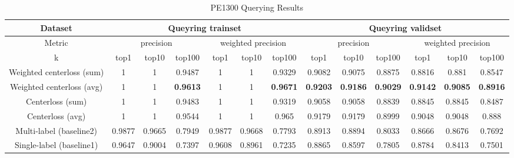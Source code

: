 \begin{table*}[!htb]%
\caption{PE1300 Querying Results}
\label{tab:pe_result}
\begin{minipage}{\textwidth}
\begin{center}
\begin{tabular}{|c|c|c|c|c|c|c|c|c|c|c|c|c|}
\hline
Dataset             & \multicolumn{6}{c|}{Queyring trainset}                      & \multicolumn{6}{c|}{Queyring validset}                      \\ \hline
Metric              & \multicolumn{3}{c|}{precision}  & \multicolumn{3}{c|}{weighted precision} & \multicolumn{3}{c|}{precision}  & \multicolumn{3}{c|}{weighted precision} \\ \hline
k              & top1   & top10  & top100 & top1      & top10     & top100   & top1   & top10  & top100 & top1      & top10     & top100   \\ \hline
Weighted centerloss (sum)  & 1      & 1      & 0.9487 & 1         & 1         & 0.9329   & 0.9082 & 0.9075 & 0.8875 & 0.8816    & 0.881     & 0.8547   \\ \hline
Weighted centerloss (avg) & 1      & 1      & \textbf{0.9613} & 1         & 1         & \textbf{0.9671}   & \textbf{0.9203} & \textbf{0.9186} & \textbf{0.9029 }& \textbf{0.9142}    &\textbf{ 0.9085}    & \textbf{0.8916}   \\ \hline
Centerloss (sum)         & 1      & 1      & 0.9483 & 1         & 1         & 0.9319   & 0.9058 & 0.9058 & 0.8839 & 0.8845    & 0.8845    & 0.8487   \\ \hline
Centerloss (avg)        & 1      & 1      & 0.9544 & 1         & 1         & 0.965    & 0.9179 & 0.9179 & 0.8999 & 0.9048    & 0.9048    & 0.888    \\ \hline
Multi-label (baseline2)               & 0.9877 & 0.9665 & 0.7949 & 0.9877    & 0.9668    & 0.7793   & 0.8913 & 0.8894 & 0.8033 & 0.8666    & 0.8676    & 0.7692   \\ \hline
Single-label (baseline1)              & 0.9647 & 0.9004 & 0.7397 & 0.9608    & 0.8961    & 0.7235   & 0.8865 & 0.8597 & 0.7805 & 0.8784    & 0.8413    & 0.7501   \\ \hline
\end{tabular}
\end{center}
\bigskip\centering

\end{minipage}
\end{table*}%


